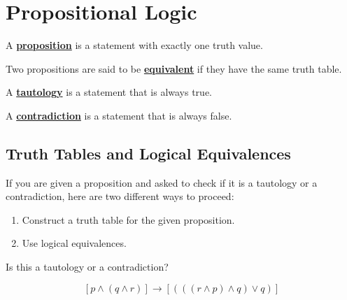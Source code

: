\chapter{Propositional Logic}
\begin{definition}
    A \underline{\textbf{proposition}} is a statement with exactly one truth
    value.
\end{definition}
\begin{definition}
    Two propositions are said to be \underline{\textbf{equivalent}} if they
    have the same truth table.
\end{definition}
\begin{definition}
    A \underline{\textbf{tautology}} is a statement that is always true.
\end{definition}
\begin{definition}
    A \underline{\textbf{contradiction}} is a statement that is always false.
\end{definition}

\section{Truth Tables and Logical Equivalences}
If you are given a proposition and asked to check if it is a tautology or a
contradiction, here are two different ways to proceed:

\begin{enumerate}[noitemsep]
    \item Construct a truth table for the given proposition.
    \item Use logical equivalences.
\end{enumerate}

\begin{question}
    Is this a tautology or a contradiction?

    \[
        [p \wedge (q \wedge r)] \rightarrow [( ( (r \wedge p)\wedge q) \vee q)]
    \]
\end{question}


